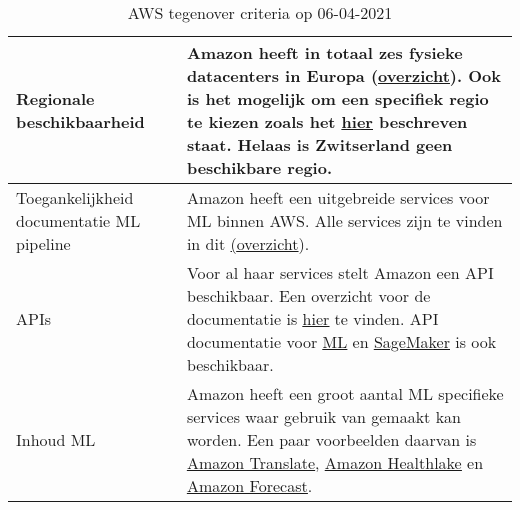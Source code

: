 \begin{table}[hbt!]
\begin{tabular}{|p{.2\linewidth}|p{.74\linewidth}|}
    Regionale \newline beschikbaarheid
    &
    Amazon heeft in totaal zes fysieke datacenters in Europa (\underline{\href{https://aws.amazon.com/about-aws/global-infrastructure/regions_az/}{overzicht}}). Ook is het mogelijk om een specifiek regio te kiezen zoals het \underline{\href{https://docs.aws.amazon.com/AWSEC2/latest/UserGuide/using-regions-availability-zones.html\#using-regions-availability-zones-setup}{hier}} beschreven staat. Helaas is Zwitserland geen beschikbare regio.
    \\ \hline

    Toegankelijkheid documentatie ML pipeline
    &
    Amazon heeft een uitgebreide services voor ML binnen AWS. Alle services zijn te vinden in dit \underline(\href{https://aws.amazon.com/machine-learning/}{overzicht}).
    \\ \hline

    APIs
    &
    Voor al haar services stelt Amazon een API beschikbaar. Een overzicht voor de documentatie is \underline{\href{https://docs.aws.amazon.com/index.html?nc2=h_ql_doc_do_v}{hier}} te vinden. API documentatie voor \underline{\href{https://docs.aws.amazon.com/machine-learning/}{ML}} en \underline{\href{https://docs.aws.amazon.com/sagemaker/}{SageMaker}} is ook beschikbaar.
    \\ \hline

    Inhoud ML
    &
    Amazon heeft een groot aantal ML specifieke services waar gebruik van gemaakt kan worden. Een paar voorbeelden daarvan is \underline{\href{https://aws.amazon.com/translate/}{Amazon Translate}}, \underline{\href{https://aws.amazon.com/healthlake/}{Amazon Healthlake}} en \underline{\href{https://aws.amazon.com/forecast/}{Amazon Forecast}}.
    \\ \hline
  \end{tabular}
  \caption{AWS tegenover criteria op 06-04-2021}
  \label{table:aws-against-criteria}
\end{table}

\newpage

